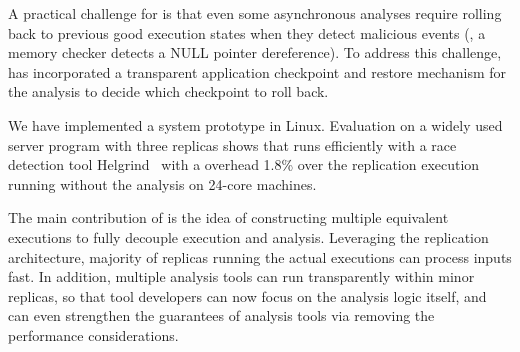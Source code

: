 A practical challenge for \xxx is that even some asynchronous analyses require 
rolling back to previous good execution states when they detect malicious 
events (\eg, a memory checker detects a NULL pointer dereference). To address 
this challenge, \xxx has incorporated a transparent application checkpoint and 
restore mechanism for the analysis to decide which checkpoint to roll back.


We have implemented a \xxx system prototype in Linux. Evaluation on a widely 
used server program \clamav with three replicas shows that \xxx runs 
efficiently with a race detection tool Helgrind~\cite{valgrind:pldi} with 
a overhead 1.8\% over the replication execution running without the analysis on 
24-core machines.







The main contribution of \xxx is the idea of constructing multiple equivalent 
executions to fully decouple execution and analysis. Leveraging the replication 
architecture, majority of replicas running the actual executions can process 
inputs fast. In addition, multiple analysis tools can run transparently within 
minor replicas, so that tool developers can now focus on the analysis logic 
itself, and can even strengthen the guarantees of analysis tools via removing 
the performance considerations.




